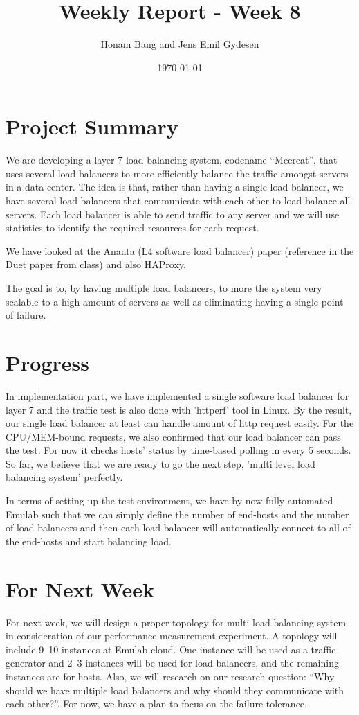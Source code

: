 \documentclass[11pt,letter]{article}
\author{Honam Bang and Jens Emil Gydesen}
\date{\today}
\title{Weekly Report - Week 8}
\begin{document}
\maketitle
\section{Project Summary}
We are developing a layer 7 load balancing system, codename ``Meercat'', that uses several load balancers to more efficiently balance the traffic amongst servers in a data center. The idea is that, rather than having a single load balancer, we have several load balancers that communicate with each other to load balance all servers. Each load balancer is able to send traffic to any server and we will use statistics to identify the required resources for each request.

We have looked at the Ananta (L4 software load balancer) paper (reference in the Duet paper from class)\cite{ananta} and also HAProxy\cite{haproxy}.

The goal is to, by having multiple load balancers, to more the system very scalable to a high amount of servers as well as eliminating having a single point of failure. 

\section{Progress}
In implementation part, we have implemented a single software load balancer for layer 7 and the traffic test is also done with 'httperf' tool in Linux. By the result, our single load balancer at least can handle amount of http request easily. For the CPU/MEM-bound requests, we also confirmed that our load balancer can pass the test. For now it checks hosts' status by time-based polling in every 5 seconds. So far, we believe that we are ready to go the next step, 'multi level load balancing system' perfectly.

In terms of setting up the test environment, we have by now fully automated Emulab such that we can simply define the number of end-hosts and the number of load balancers and then each load balancer will automatically connect to all of the end-hosts and start balancing load. 

\section{For Next Week}
For next week, we will design a proper topology for multi load balancing system in consideration of our performance measurement experiment. A topology will include 9~10 instances at Emulab cloud. One instance will be used as a traffic generator and 2~3 instances will be used for load balancers, and the remaining instances are for hosts. Also, we will research on our research question: ``Why should we have multiple load balancers and why should they communicate with each other?''. For now, we have a plan to focus on the failure-tolerance. 
\end{document}
